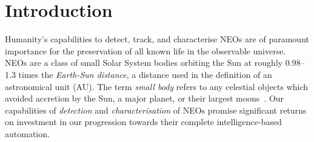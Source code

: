 \chapter{Introduction}

Humanity's capabilities to detect, track, and characterise \glspl{NEO} are of 
paramount importance for the preservation of all known life in the observable universe. \glspl{NEO} are a class of small Solar System bodies orbiting the Sun at roughly 0.98--1.3 times the \textit{Earth-Sun distance}, a distance used in the definition of an astronomical unit (AU). The term \textit{small body} refers to any celestial objects which avoided accretion by the Sun, a major planet, or their largest moons~\cite{Davidsson2021}. Our capabilities of \textit{detection} and \textit{characterisation} of \glspl{NEO} promise significant returns on investment in our progression towards their complete intelligence-based automation. %

